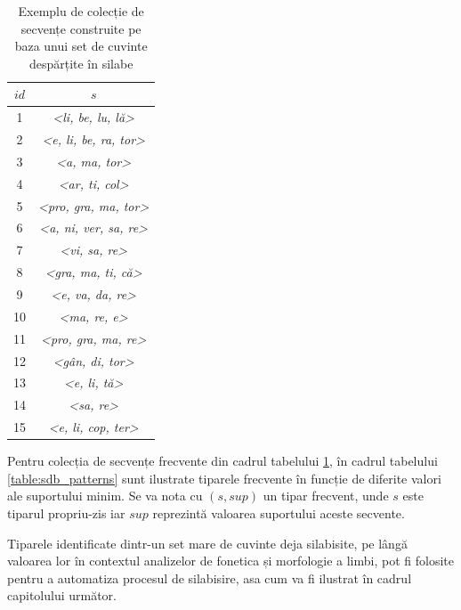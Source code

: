 \begin{table}[h]
\centering    
\begin{tabular}{|c|c|}    
\hline      
$id$ & $s$ \\
\hline
1 & \textit{<li, be, lu, lă>} \\
2 & \textit{<e, li, be, ra, tor>} \\
3 & \textit{<a, ma, tor>}\\
4 & \textit{<ar, ti, col>} \\
5 & \textit{<pro, gra, ma, tor>} \\
6 & \textit{<a, ni, ver, sa, re>} \\
7 & \textit{<vi, sa, re>} \\
8 & \textit{<gra, ma, ti, că>} \\
9 & \textit{<e, va, da, re>} \\
10 & \textit{<ma, re, e>} \\
11 & \textit{<pro, gra, ma, re>} \\
12 & \textit{<gân, di, tor>} \\
13 & \textit{<e, li, tă>} \\
14 & \textit{<sa, re>} \\
15 & \textit{<e, li, cop, ter>} \\
\hline                              
\end{tabular}
\caption{Exemplu de colecție de secvențe construite pe baza unui set de cuvinte despărțite în silabe}
\label{table:sdb_words}               
\end{table}

Pentru colecția de secvențe frecvente din cadrul tabelului \ref{table:sdb_words}, în cadrul tabelului \ref{table:sdb_patterns} sunt ilustrate tiparele frecvente în funcție de diferite valori ale suportului minim. Se va nota cu $(s,sup)$ un tipar frecvent, unde $s$ este tiparul propriu-zis iar $sup$ reprezintă valoarea suportului aceste secvente.

Tiparele identificate dintr-un set mare de cuvinte deja silabisite, pe lângă valoarea lor în contextul analizelor de fonetica și morfologie a limbi, pot fi folosite pentru a automatiza procesul de silabisire, asa cum va fi ilustrat în cadrul capitolului următor.

